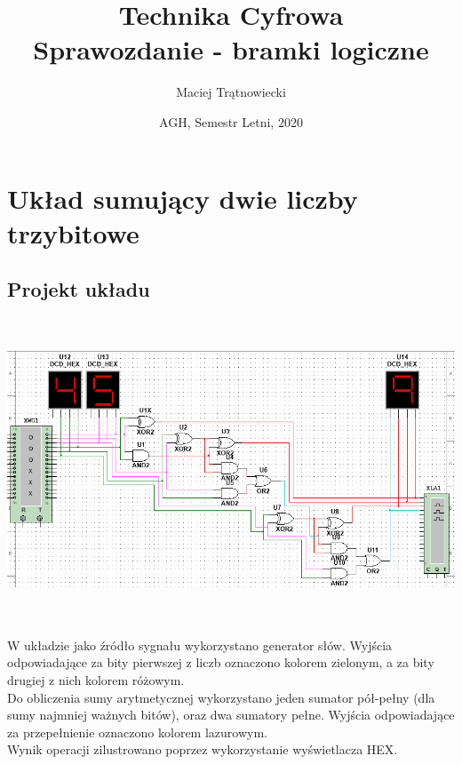 \documentclass{article}
\title{Technika Cyfrowa\\
Sprawozdanie - bramki logiczne}
\author{Maciej Trątnowiecki}
\date{AGH, Semestr Letni, 2020}
\begin{document}
    \maketitle
    \section{Układ sumujący dwie liczby trzybitowe}
        \subsection{Projekt układu}
            \begin{center}
                \includegraphics[height=9cm]{reports/img/Z1A_1.png}\\
            \end{center}
            W układzie jako źródło sygnału wykorzystano generator słów. Wyjścia odpowiadające za bity pierwszej z liczb oznaczono kolorem zielonym, a za bity drugiej z nich kolorem różowym. \\
            Do obliczenia sumy arytmetycznej wykorzystano jeden sumator pół-pełny (dla sumy najmniej ważnych bitów), oraz dwa sumatory pełne. Wyjścia odpowiadające za przepełnienie oznaczono kolorem lazurowym. \\
            Wynik operacji zilustrowano poprzez wykorzystanie wyświetlacza HEX. 
        
\end{document}
